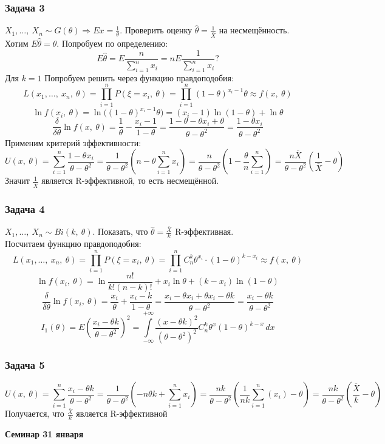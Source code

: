 \documentclass[12pt, a4paper]{article}
\begin{document}
\subsubsection*{Задача 3}
$X_1,\dots,\ X_n \sim G(\theta)\Rightarrow Ex = \frac{1}{\theta}$. Проверить оценку $\hat{\theta} = \frac{1}{\overline{X}}$ на несмещённость.\\
Хотим $E\hat{\theta} = \theta$. Попробуем по определению:
\[E\hat{\theta} = E \frac{n}{\sum\limits_{i = 1}^{n} x_i} = n E\frac{1}{\sum\limits_{i = 1}^{n} x_i}?\]
Для $k = 1$ 
Попробуем решить через функцию правдоподобия:
\[L(x_1,\dots,\ x_n,\ \theta) = \prod_{i = 1}^{n} P(\xi = x_i,\ \theta) = \prod_{i = 1}^{n} (1 - \theta)^{x_i - 1}\theta \approx f(x,\ \theta)\]
\[\ln f(x_i,\ \theta) = \ln \big( (1 - \theta)^{x_i - 1} \theta \big) = (x_i - 1)\ln (1 - \theta) + \ln \theta\]
\[\frac{\delta}{\delta \theta} \ln f(x,\ \theta) = \frac{1}{\theta} - \frac{x_i - 1}{1 - \theta} = \frac{1 - \theta - \theta x_i + \theta}{\theta - \theta^2} = \frac{1 - \theta x_i}{\theta - \theta^2}\]
Применим критерий эффективности:
\[U(x,\ \theta) = \sum_{i = 1}^{n} \frac{1 - \theta x_i}{\theta - \theta^2} = \frac{1}{\theta - \theta^2} \left( n - \theta \sum_{i = 1}^{n} x_i \right) = \frac{n}{\theta - \theta^2} \left( 1 - \frac{\theta}{n} \sum_{i = 1}^{n} \right) = \frac{n\overline{X}}{\theta - \theta^2} \left( \frac{1}{\overline{X}} - \theta \right)\]
Значит $\frac{1}{\overline{X}}$ является R-эффективной, то есть несмещённой.
\subsubsection*{Задача 4}
$X_1,\dots,\ X_n \sim Bi(k,\ \theta)$. Показать, что $\hat{\theta}  = \frac{\overline{X}}{k}$ R-эффективная.\\
Посчитаем функцию правдоподобия:
\[L(x_1,\dots,\ x_n,\ \theta) = \prod_{i = 1}^{n} P(\xi = x_i,\ \theta) = \prod_{i = 1}^{n} C_n^k\theta^{x_i}\cdot (1 - \theta)^{k - x_i} \approx f(x,\ \theta)\]
\[\ln f(x_i,\ \theta) = \ln\frac{n!}{k!(n - k)!} + x_i \ln \theta + (k - x_i)\ln (1 - \theta)\]
\[\frac{\delta}{\delta \theta} \ln f(x_i,\ \theta) = \frac{x_i}{\theta} + \frac{x_i - k}{1 - \theta} = \frac{x_i - \theta x_i + \theta x_i - \theta k}{\theta - \theta^2} = \frac{x_i - \theta k}{\theta - \theta^2}\]
\[I_1(\theta) = E \left( \frac{x_i - \theta k}{\theta - \theta^2} \right)^2 = \int\limits_{-\infty}^{+\infty} \frac{(x - \theta k)^2}{(\theta - \theta^2)^2} C_n^k \theta^{x} (1 - \theta)^{k - x}\, dx\]
\subsubsection*{Задача 5}
\[U(x,\ \theta) = \sum_{i = 1}^{n} \frac{x_i - \theta k}{\theta - \theta^2} = \frac{1}{\theta - \theta^2}\left(-n\theta k + \sum_{i = 1}^{n} x_i\right) = \frac{nk}{\theta - \theta^2}\left( \frac{1}{nk} \sum_{i = 1}^{n} (x_i) - \theta \right) = \frac{nk}{\theta - \theta^2} \left( \frac{\overline{X}}{k} - \theta \right)\]
Получается, что $\frac{\overline{X}}{k}$ является R-эффективной
\begin{center}
    \bf Семинар 31 января
\end{center}
\end{document}
